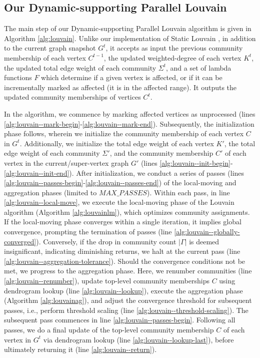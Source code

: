 \subsection{Our Dynamic-supporting Parallel Louvain}
\label{sec:our-louvain}

The main step of our Dynamic-supporting Parallel Louvain algorithm is given in Algorithm \ref{alg:louvain}. Unlike our implementation of Static Louvain \cite{sahu2023gvelouvain}, in addition to the current graph snapshot $G^t$, it accepts as input the previous community membership of each vertex $C^{t-1}$, the updated weighted-degree of each vertex $K^t$, the updated total edge weight of each community $\Sigma^t$, and a set of lambda functions $F$ which determine if a given vertex is affected, or if it can be incrementally marked as affected (it is in the affected range). It outputs the updated community memberships of vertices $C^t$.



In the algorithm, we commence by marking affected vertices as unprocessed (lines \ref{alg:louvain--mark-begin}-\ref{alg:louvain--mark-end}). Subsequently, the initialization phase follows, wherein we initialize the community membership of each vertex $C$ in $G^t$. Additionally, we initialize the total edge weight of each vertex $K'$, the total edge weight of each community $\Sigma'$, and the community membership $C'$ of each vertex in the current/super-vertex graph $G'$ (lines \ref{alg:louvain--init-begin}-\ref{alg:louvain--init-end}). After initialization, we conduct a series of passes (lines \ref{alg:louvain--passes-begin}-\ref{alg:louvain--passes-end}) of the local-moving and aggregation phases (limited to $MAX\_PASSES$). Within each pass, in line \ref{alg:louvain--local-move}, we execute the local-moving phase of the Louvain algorithm (Algorithm \ref{alg:louvainlm}), which optimizes community assignments. If the local-moving phase converges within a single iteration, it implies global convergence, prompting the termination of passes (line \ref{alg:louvain--globally-converged}). Conversely, if the drop in community count $|\Gamma|$ is deemed insignificant, indicating diminishing returns, we halt at the current pass (line \ref{alg:louvain--aggregation-tolerance}). Should the convergence conditions not be met, we progress to the aggregation phase. Here, we renumber communities (line \ref{alg:louvain--renumber}), update top-level community memberships $C$ using dendrogram lookup (line \ref{alg:louvain--lookup}), execute the aggregation phase (Algorithm \ref{alg:louvainag}), and adjust the convergence threshold for subsequent passes, i.e., perform threshold scaling (line \ref{alg:louvain--threshold-scaling}). The subsequent pass commences in line \ref{alg:louvain--passes-begin}. Following all passes, we do a final update of the top-level community membership $C$ of each vertex in $G^t$ via dendrogram lookup (line \ref{alg:louvain--lookup-last}), before ultimately returning it (line \ref{alg:louvain--return}).


